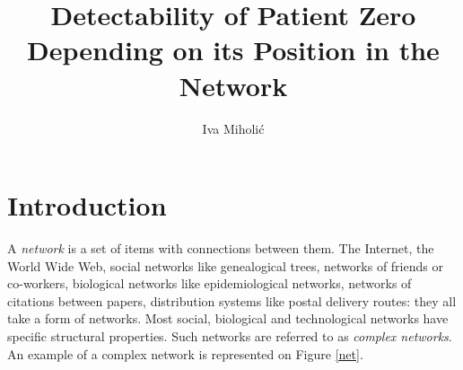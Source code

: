 \documentclass[times, utf8, diplomski]{fer}
\begin{document}

\title{Detectability of Patient Zero Depending on its Position in the Network}

\author{Iva Miholić}

\maketitle

\izvornik

\zahvala{}

\tableofcontents

\chapter{Introduction}

A \emph{network} is a set of items with connections between them. The Internet, the World Wide Web, social networks like genealogical trees, networks of friends or co-workers, biological networks like epidemiological networks, networks of citations between papers, distribution systems like postal delivery routes: they all take a form of networks. Most social, biological and technological networks have specific structural properties. Such networks are referred to as \emph{complex networks}.  An example of a complex network is represented on Figure \ref{net}.
\end{document}
